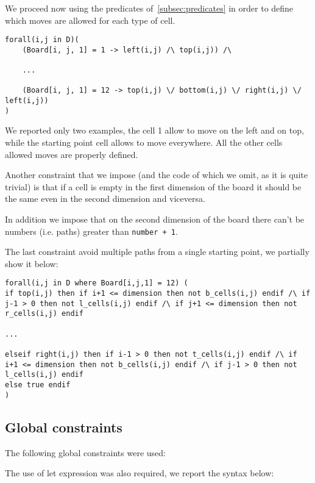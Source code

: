 We proceed now using the predicates of~\ref{subsec:predicates} in order to define which moves are allowed for each type of cell.


\begin{verbatim}
forall(i,j in D)(
    (Board[i, j, 1] = 1 -> left(i,j) /\ top(i,j)) /\

    ...

    (Board[i, j, 1] = 12 -> top(i,j) \/ bottom(i,j) \/ right(i,j) \/ left(i,j))
)
\end{verbatim}

We reported only two examples, the cell 1 allow to move on the left and on top, while the starting point cell allows to move everywhere. All the other cells allowed moves are properly defined.

Another constraint that we impose (and the code of which we omit, as it is quite trivial) is that if a cell is empty in the first dimension of the board it should be the same even in the second dimension and viceversa.

In addition we impose that on the second dimension of the board there can't be numbers (i.e. paths) greater than \texttt{number + 1}.

The last constraint avoid multiple paths from a single starting point, we partially show it below:

\begin{verbatim}
forall(i,j in D where Board[i,j,1] = 12) (
if top(i,j) then if i+1 <= dimension then not b_cells(i,j) endif /\ if j-1 > 0 then not l_cells(i,j) endif /\ if j+1 <= dimension then not r_cells(i,j) endif

...

elseif right(i,j) then if i-1 > 0 then not t_cells(i,j) endif /\ if i+1 <= dimension then not b_cells(i,j) endif /\ if j-1 > 0 then not l_cells(i,j) endif
else true endif
)
\end{verbatim}


\subsection{Global constraints}
The following global constraints were used:

The use of let expression was also required, we report the syntax below:

